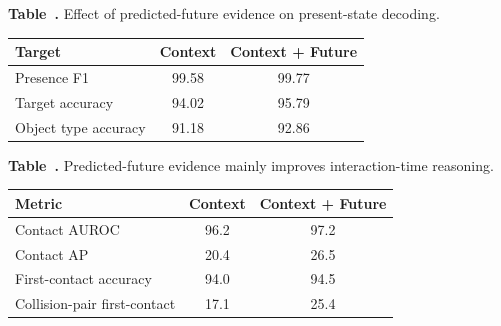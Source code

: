\begin{table}[t]
\centering
\setlength{\tabcolsep}{3.5pt}
\renewcommand{\arraystretch}{1.03}
\begin{minipage}[t]{0.48\linewidth}
\vspace{0pt}
\label{tab:physion-future-semantics}
\centering
\parbox[t][2.6em][t]{\linewidth}{\centering\textbf{Table~\thetable.} Effect of predicted-future evidence on present-state decoding.}\par\smallskip
\begin{tabularx}{\linewidth}{@{}Lcc@{}}
\toprule\toprule
\textbf{Target} & \textbf{Context} & \textbf{Context + Future} \\
\midrule
Presence F1 & 99.58 & 99.77 \\
Target accuracy & 94.02 & 95.79 \\
Object type accuracy & 91.18 & 92.86 \\
\bottomrule\bottomrule
\end{tabularx}
\end{minipage}
\hfill
\begin{minipage}[t]{0.48\linewidth}
\vspace{0pt}
\label{tab:clevrer-future-events}
\centering
\parbox[t][2.6em][t]{\linewidth}{\centering\textbf{Table~\thetable.} Predicted-future evidence mainly improves interaction-time reasoning.}\par\smallskip
\begin{tabularx}{\linewidth}{@{}Lcc@{}}
\toprule\toprule
\textbf{Metric} & \textbf{Context} & \textbf{Context + Future} \\
\midrule
Contact AUROC & 96.2 & 97.2 \\
Contact AP & 20.4 & 26.5 \\
First-contact accuracy & 94.0 & 94.5 \\
Collision-pair first-contact & 17.1 & 25.4 \\
\bottomrule\bottomrule
\end{tabularx}
\end{minipage}
\end{table}
